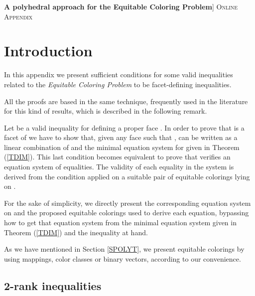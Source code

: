 
\appendix

\begin{center} {\Large
\textbf{A polyhedral approach for the Equitable Coloring Problem}}\12pt]
\textsc{Online Appendix}
\end{center}

\section{Introduction} 

In this appendix we present sufficient conditions for some valid inequalities related to the \emph{Equitable Coloring Problem}
to be facet-defining inequalities.



All the proofs are based in the same technique, frequently used in the
literature for this kind of results, which is described in the following
remark.

\begin{trem} \label{TECHNIQUE}
Let  be a valid inequality for  defining a proper face .
In order to prove that  is a facet of  we have to show that, given any face  such that ,  can be written as a linear combination of  and the minimal equation system for  given in Theorem (\ref{TDIM}). This last condition becomes equivalent to prove that  verifies an equation system of  equalities.
The validity of each equality in the system is derived from the condition 
 applied on a suitable pair of equitable colorings  lying on .
\end{trem}

For the sake of simplicity, we directly present the corresponding equation system on  and the proposed equitable colorings used to derive each equation, bypassing how to get that equation system from the minimal equation system given in Theorem (\ref{TDIM}) and the inequality at hand.

As we have mentioned in Section \ref{SPOLYT}, we present equitable colorings by using mappings, color classes or binary vectors, according to our convenience.







\subsection{2-rank inequalities}

